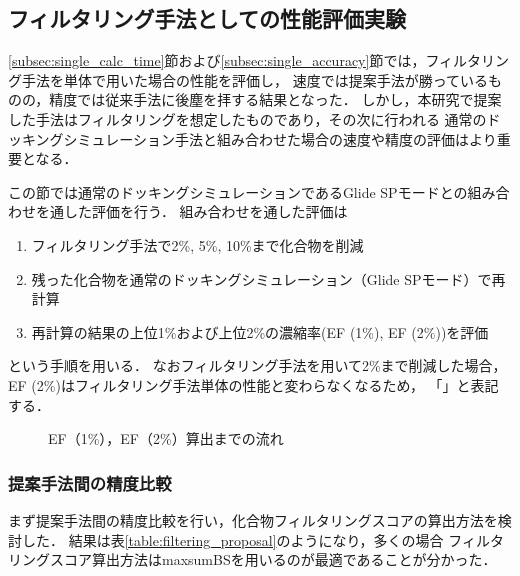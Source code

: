 \subsection{フィルタリング手法としての性能評価実験}
\ref{subsec:single_calc_time}節および\ref{subsec:single_accuracy}節では，フィルタリング手法を単体で用いた場合の性能を評価し，
速度では提案手法が勝っているものの，精度では従来手法に後塵を拝する結果となった．
しかし，本研究で提案した手法はフィルタリングを想定したものであり，その次に行われる
通常のドッキングシミュレーション手法と組み合わせた場合の速度や精度の評価はより重要となる．


この節では通常のドッキングシミュレーションであるGlide SPモードとの組み合わせを通した評価を行う．
組み合わせを通した評価は
\begin{enumerate}
\item フィルタリング手法で2\%, 5\%, 10\%まで化合物を削減
\item 残った化合物を通常のドッキングシミュレーション（Glide SPモード）で再計算
\item 再計算の結果の上位1\%および上位2\%の濃縮率(EF (1\%), EF (2\%))を評価
\end{enumerate}
という手順を用いる．
なおフィルタリング手法を用いて2\%まで削減した場合，EF (2\%)はフィルタリング手法単体の性能と変わらなくなるため，
「\textendash」と表記する．

\begin{figure}[htp]
 \begin{center}
  \caption{EF（1\%），EF（2\%）算出までの流れ}
  \label{fig:filtering_image}
 \end{center}
\end{figure}

\subsubsection{提案手法間の精度比較}\label{subsubsec:filtering_proposal}
まず提案手法間の精度比較を行い，化合物フィルタリングスコアの算出方法を検討した．
結果は表\ref{table:filtering_proposal}のようになり，多くの場合
フィルタリングスコア算出方法はmaxsumBSを用いるのが最適であることが分かった．

